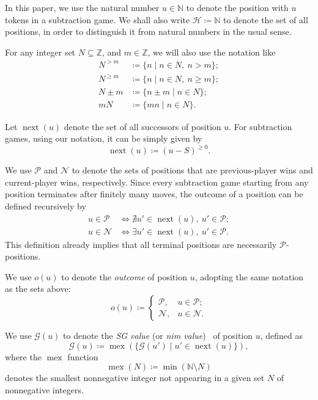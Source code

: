 \documentclass[11pt]{article}
\theoremstyle{definition}
\theoremstyle{plain}
\newcommand{\nxt}{\operatorname{next}}
\newcommand{\mex}{\operatorname{mex}}
\begin{document}
In this paper, we use the natural number $u \in \mathbb{N}$ to denote the position with $u$ tokens in a subtraction game.
We shall also write $\mathcal{H} \coloneq\mathbb{N}$ to denote the set of all positions, in order to distinguish it from natural numbers in the usual sense.

For any integer set $N\subseteq\mathbb{Z}$, and $m\in\mathbb{Z}$, we will also use the notation like
\begin{align*}
    N^{>m}     &\coloneq \{n \mid n\in N,\ n> m\}; \\
    N^{\geq m} &\coloneq \{n \mid n\in N,\ n\geq m\}; \\
    N\pm m     &\coloneq \{n\pm m \mid n\in N\}; \\
    mN         &\coloneq \{mn \mid n\in N\}.
\end{align*}

Let $\nxt(u)$ denote the set of all successors of position $u$.
For subtraction games, using our notation, it can be simply given by
\[
    \nxt(u) \coloneq (u-S)^{\geq 0}.
\]

We use $\mathcal{P}$ and $\mathcal{N}$ to denote the sets of positions that are previous-player wins and current-player wins, respectively.
Since every subtraction game starting from any position terminates after finitely many moves, the outcome of a position can be defined recursively by
\begin{align*}
    u \in \mathcal{P} &\iff \nexists u'\in \nxt(u),\ u'\in\mathcal{P}; \\
    u \in \mathcal{N} &\iff \exists  u'\in \nxt(u),\ u'\in\mathcal{P}.
\end{align*}
This definition already implies that all terminal positions are necessarily $\mathcal{P}$-positions.

We use $o(u)$ to denote the \textit{outcome} of position $u$, adopting the same notation as the sets above:
\[
    o(u) \coloneq
    \begin{cases}
        \mathcal{P}, & u\in\mathcal{P};\\
        \mathcal{N}, & u\in\mathcal{N}.
    \end{cases}
\]

We use $\mathcal{G}(u)$ to denote the \textit{SG value} (or \textit{nim value})~\cite{Sprague1935, Grundy1939} of position $u$, defined as
\[
    \mathcal{G}(u) \coloneq \mex(\{ \mathcal{G}(u') \mid u'\in\nxt(u)\}),
\]
where the $\mex$ function
\[
    \mex(N) \coloneq \min (\mathbb{N} \setminus N)
\]
denotes the smallest nonnegative integer not appearing in a given set $N$ of nonnegative integers.
\end{document}
